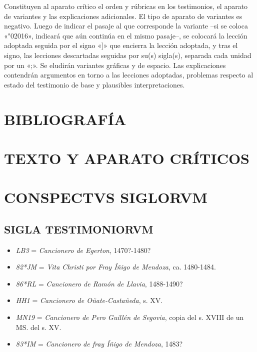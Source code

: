 \documentclass[11pt,a4paper,twoside]{article}
\newcommand{\comillas}[1]{«#1»}
\begin{document}
%
Constituyen al aparato crítico el orden y rúbricas en los testimonios, el aparato de variantes y las explicaciones adicionales. El tipo de aparato de variantes es negativo. Luego de indicar el pasaje al que corresponde la variante --si se coloca \comillas{\char"02016}, indicará que aún continúa en el mismo pasaje--, se colocará la lección adoptada seguida por el signo \comillas{]} que encierra la lección adoptada, y tras el signo, las lecciones descartadas seguidas por su(s) sigla(s), separada cada unidad por un \comillas{;}. Se eludirán variantes gráficas y de espacio. Las explicaciones contendrán argumentos en torno a las lecciones adoptadas, problemas respecto al estado del testimonio de base y plausibles interpretaciones.\par

\section*{\centering\fontsize{11}{14}\selectfont BIBLIOGRAFÍA}
\nocite{*}
\printbibliography[heading=none]
\newpage

\section*{\centering\fontsize{13}{14}\selectfont TEXTO Y APARATO CRÍTICOS}
\newpage

\section*{\centering\fontsize{11}{14.35}\selectfont CONSPECTVS SIGLORVM}

\subsection*{\centering\fontsize{9.5}{12}\selectfont SIGLA TESTIMONIORVM}
\vspace*{-2.5pt}
\begin{itemize}[label=,leftmargin=0.6cm]%
\item \emph{LB3} = \emph{Cancionero de Egerton}, 1470?-1480?
\item \emph{82*JM} = \emph{Vita Christi por Fray Íñigo de Mendoza}, ca. 1480-1484.
\item \emph{86*RL} = \emph{Cancionero de Ramón de Llavia}, 1488-1490?
\item \emph{HH1} = \emph{Cancionero de Oñate-Castañeda}, s. XV.
\item \emph{MN19} = \emph{Cancionero de Pero Guillén de Segovia}, copia del s. XVIII de un MS. del s. XV.
\item \emph{83*IM} = \emph{Cancionero de fray Íñigo de Mendoza}, 1483?%
\end{itemize}
\end{document}
